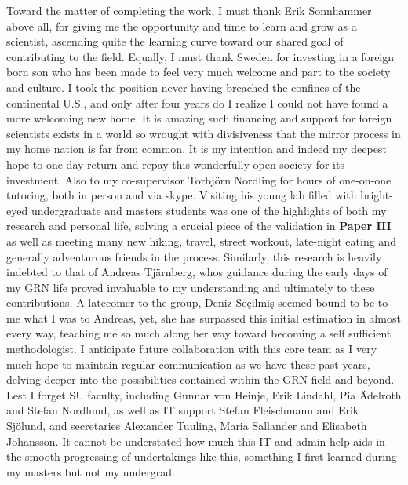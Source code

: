 Toward the matter of completing the work, I must thank Erik Sonnhammer above all, for giving me the opportunity and time to learn and grow as a scientist, ascending quite the learning curve toward our shared goal of contributing to the field. Equally, I must thank Sweden for investing in a foreign born son who has been made to feel very much welcome and part to the society and culture. I took the position never having breached the confines of the continental U.S., and only after four years do I realize I could not have found a more welcoming new home. It is amazing such financing and support for foreign scientists exists in a world so wrought with divisiveness that the mirror process in my home nation is far from common. It is my intention and indeed my deepest hope to one day return and repay this wonderfully open society for its investment. Also to my co-supervisor Torbj{\"o}rn Nordling for hours of one-on-one tutoring, both in person and via skype. Visiting his young lab filled with bright-eyed undergraduate and masters students was one of the highlights of both my research and personal life, solving a crucial piece of the validation in \textbf{Paper III} as well as meeting many new hiking, travel, street workout, late-night eating and generally adventurous friends in the process. Similarly, this research is heavily indebted to that of Andreas Tj{\"a}rnberg, whos guidance during the early days of my GRN life proved invaluable to my understanding and ultimately to these contributions. A latecomer to the group, Deniz Seçilmiş seemed bound to be to me what I was to Andreas, yet, she has surpassed this initial estimation in almost every way, teaching me so much along her way toward becoming a self sufficient methodologist. I anticipate future collaboration with this core team as I very much hope to maintain regular communication as we have these past years, delving deeper into the possibilities contained within the GRN field and beyond. Lest I forget SU faculty, including Gunnar von Heinje, Erik Lindahl, Pia {\"A}delroth and Stefan Nordlund, as well as IT support Stefan Fleischmann and Erik Sj{\"o}lund, and secretaries Alexander Tuuling, Maria Sallander and Elisabeth Johansson. It cannot be understated how much this IT and admin help aids in the smooth progressing of undertakings like this, something I first learned during my masters but not my undergrad.

